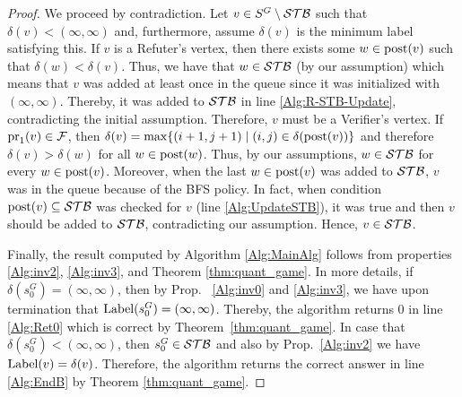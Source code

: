 \begin{proof}
We proceed by contradiction. Let $v \in S^G \setminus \mathcal{STB}$ such that $\delta(v) < (\infty, \infty)$ and, furthermore, assume 
$\delta(v)$ is the minimum label satisfying this.
If $v$ is a Refuter's vertex, then there exists some $w \in \operatorname{post}(v)$ such that $\delta(w) < \delta(v)$. 
Thus, we have that $w \in \mathcal{STB}$ (by our assumption) which means that $v$ was added at least once in the queue since it 
was initialized with $(\infty, \infty)$. 
Thereby, it was added to $\mathcal{STB}$ in line \ref{Alg:R-STB-Update}, contradicting the initial assumption. 
Therefore, $v$ must be a Verifier's vertex. 
If $\operatorname{pr}_{1}(v) \in \mathcal{F}$, then $\delta(v) = \max \{(i+1,j+1) \mid (i,j) \in \delta(\operatorname{post}(v))\}$ 
and therefore $\delta(v) > \delta(w)$ for all $w \in \operatorname{post}(w)$.
Thus, by our assumptions, $w \in \mathcal{STB}$ for every $w \in \operatorname{post}(v)$.
Moreover, when the last $w \in \operatorname{post}(v)$ was added to $\mathcal{STB}$, $v$ was in the queue because of the BFS policy.
In fact, when condition $\operatorname{post}(v) \subseteq \mathcal{STB}$ was checked for $v$ (line \ref{Alg:UpdateSTB}), it was true and then $v$ 
should be added to $\mathcal{STB}$, contradicting our assumption. Hence, $v \in \mathcal{STB}$.

Finally, the result computed by Algorithm \ref{Alg:MainAlg} follows from properties \ref{Alg:inv2}, \ref{Alg:inv3}, 
and Theorem \ref{thm:quant_game}. 
In more details, if $\delta(s_{0}^G) = (\infty, \infty)$, then by Prop. ~\ref{Alg:inv0} and \ref{Alg:inv3}, we 
have upon termination that $\operatorname{Label}(s_{0}^G) = (\infty, \infty)$. 
Thereby, the algorithm returns $0$ in line \ref{Alg:Ret0} which is correct by Theorem~\ref{thm:quant_game}. 
In case that $\delta(s_0^G)< (\infty, \infty)$, then $s_0^G \in \mathcal{STB}$ and also by Prop.~\ref{Alg:inv2} we 
have $\operatorname{Label}(v) = \delta(v)$. Therefore, the algorithm returns the correct answer in line \ref{Alg:EndB} by Theorem \ref{thm:quant_game}. 
\qedhere
\end{proof}




